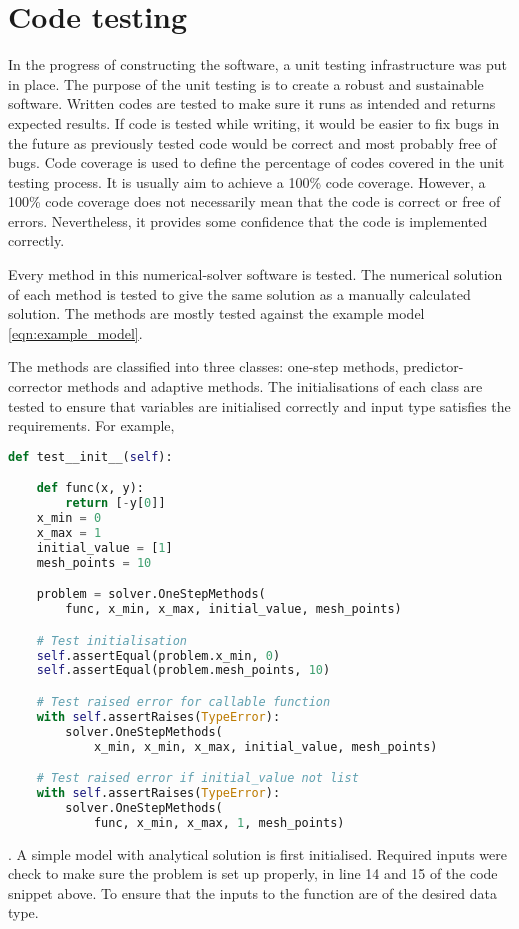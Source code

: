 \chapter{Code testing}
\label{chap:code-testing}
In the progress of constructing the software, a unit testing infrastructure was put in place. The purpose of the unit testing is to create a robust and sustainable software. Written codes are tested to make sure it runs as intended and returns expected results. If code is tested while writing, it would be easier to fix bugs in the future as previously tested code would be correct and most probably free of bugs. Code coverage is used to define the percentage of codes covered in the unit testing process. It is usually aim to achieve a 100\% code coverage. However, a 100\% code coverage does not necessarily mean that the code is correct or free of errors. Nevertheless, it provides some confidence that the code is implemented correctly.

Every method in this numerical-solver software is tested. The numerical solution of each method is tested to give the same solution as a manually calculated solution. The methods are mostly tested against the example model \ref{eqn:example_model}.

The methods are classified into three classes: one-step methods, predictor-corrector methods and adaptive methods. The initialisations of each class are tested to ensure that variables are initialised correctly and input type satisfies the requirements. For example, 

\begin{lstlisting}[language=Python]
def test__init__(self):

    def func(x, y):
        return [-y[0]]
    x_min = 0
    x_max = 1
    initial_value = [1]
    mesh_points = 10

    problem = solver.OneStepMethods(
        func, x_min, x_max, initial_value, mesh_points)

    # Test initialisation
    self.assertEqual(problem.x_min, 0)
    self.assertEqual(problem.mesh_points, 10)

    # Test raised error for callable function
    with self.assertRaises(TypeError):
        solver.OneStepMethods(
            x_min, x_min, x_max, initial_value, mesh_points)

    # Test raised error if initial_value not list
    with self.assertRaises(TypeError):
        solver.OneStepMethods(
            func, x_min, x_max, 1, mesh_points)
\end{lstlisting}
. A simple model with analytical solution is first initialised. Required inputs were check to make sure the problem is set up properly, in line 14 and 15 of the code snippet above. To ensure that the inputs to the function are of the desired data type. 

